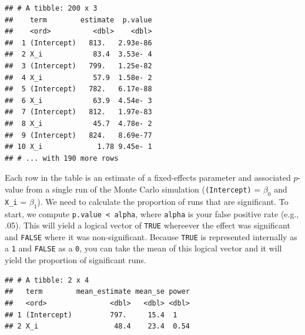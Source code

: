 \documentclass[english,doc,floatsintext]{apa6}
\newenvironment{Shaded}{\begin{snugshade}}{\end{snugshade}}
\newcommand{\CommentTok}[1]{\textcolor[rgb]{0.56,0.35,0.01}{\textit{#1}}}
\newcommand{\DataTypeTok}[1]{\textcolor[rgb]{0.13,0.29,0.53}{#1}}
\newcommand{\FloatTok}[1]{\textcolor[rgb]{0.00,0.00,0.81}{#1}}
\newcommand{\KeywordTok}[1]{\textcolor[rgb]{0.13,0.29,0.53}{\textbf{#1}}}
\newcommand{\NormalTok}[1]{#1}
\newcommand{\OperatorTok}[1]{\textcolor[rgb]{0.81,0.36,0.00}{\textbf{#1}}}
\newcommand{\StringTok}[1]{\textcolor[rgb]{0.31,0.60,0.02}{#1}}
\begin{document}
\begin{verbatim}
## # A tibble: 200 x 3
##    term        estimate  p.value
##    <ord>          <dbl>    <dbl>
##  1 (Intercept)   813.   2.93e-86
##  2 X_i            83.4  3.53e- 4
##  3 (Intercept)   799.   1.25e-82
##  4 X_i            57.9  1.58e- 2
##  5 (Intercept)   782.   6.17e-88
##  6 X_i            63.9  4.54e- 3
##  7 (Intercept)   812.   1.97e-83
##  8 X_i            45.7  4.78e- 2
##  9 (Intercept)   824.   8.69e-77
## 10 X_i             1.78 9.45e- 1
## # ... with 190 more rows
\end{verbatim}

\noindent Each row in the table is an estimate of a fixed-effects parameter and associated \(p\)-value from a single run of the Monte Carlo simulation (\texttt{(Intercept)} = \(\beta_0\) and \texttt{X\_i} = \(\beta_1\)). We need to calculate the proportion of runs that are significant. To start, we compute \texttt{p.value\ \textless{}\ alpha}, where \texttt{alpha} is your false positive rate (e.g., .05). This will yield a logical vector of \texttt{TRUE} whereever the effect was significant and \texttt{FALSE} where it was non-significant. Because \texttt{TRUE} is represented internally as a \texttt{1} and \texttt{FALSE} as a \texttt{0}, you can take the mean of this logical vector and it will yield the proportion of significant runs.

\begin{Shaded}
\end{Shaded}

\begin{verbatim}
## # A tibble: 2 x 4
##   term        mean_estimate mean_se power
##   <ord>               <dbl>   <dbl> <dbl>
## 1 (Intercept)         797.     15.4  1   
## 2 X_i                  48.4    23.4  0.54
\end{verbatim}
\end{document}
